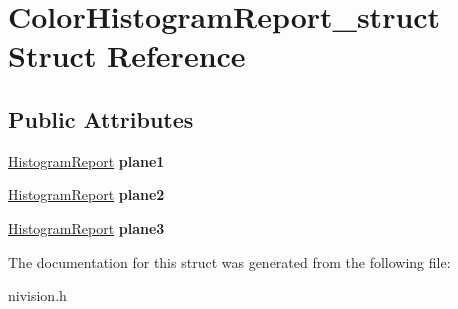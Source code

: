 \hypertarget{structColorHistogramReport__struct}{
\section{ColorHistogramReport\_\-struct Struct Reference}
\label{structColorHistogramReport__struct}
}
\subsection*{Public Attributes}
\begin{DoxyCompactItemize}
\item 
\hypertarget{structColorHistogramReport__struct_a9447c5e30b66d562ebc5ad336de28499}{
\hyperlink{structHistogramReport__struct}{HistogramReport} {\bfseries plane1}}
\label{structColorHistogramReport__struct_a9447c5e30b66d562ebc5ad336de28499}

\item 
\hypertarget{structColorHistogramReport__struct_a3a361be59dd4ec47b0a9a5a65d59bf78}{
\hyperlink{structHistogramReport__struct}{HistogramReport} {\bfseries plane2}}
\label{structColorHistogramReport__struct_a3a361be59dd4ec47b0a9a5a65d59bf78}

\item 
\hypertarget{structColorHistogramReport__struct_af4cc0cf9d3c3cbc3603dc5609e73dfd0}{
\hyperlink{structHistogramReport__struct}{HistogramReport} {\bfseries plane3}}
\label{structColorHistogramReport__struct_af4cc0cf9d3c3cbc3603dc5609e73dfd0}

\end{DoxyCompactItemize}


The documentation for this struct was generated from the following file:\begin{DoxyCompactItemize}
\item 
nivision.h\end{DoxyCompactItemize}
